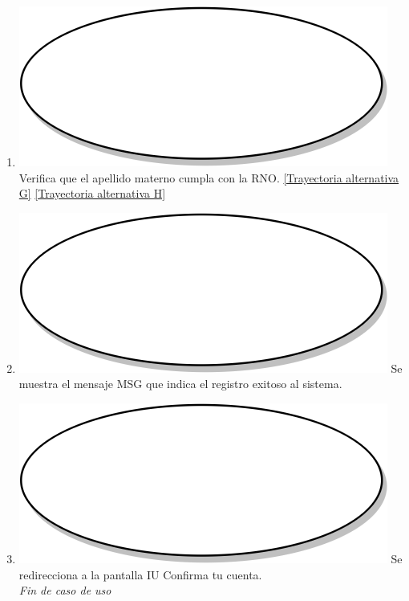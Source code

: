 \begin{enumerate}
  \item {\includegraphics[scale=.05]{Capitulo3/img/proceso.png} Verifica que el apellido materno cumpla con la RNO. \hyperref[cu2_ta_g]{[Trayectoria alternativa G]} \hyperref[cu2_ta_h]{[Trayectoria alternativa H]}}
  \item {\includegraphics[scale=.05]{Capitulo3/img/proceso.png} Se muestra el mensaje MSG que indica el registro exitoso al sistema.}
  \item {\includegraphics[scale=.1]{Capitulo3/img/proceso.png} Se redirecciona a la pantalla IU Confirma tu cuenta.}\\
  \textit{Fin de caso de uso} \\	
\end{enumerate}

